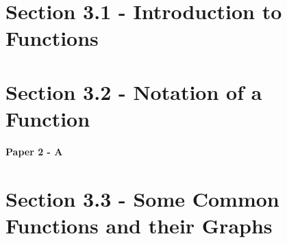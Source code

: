 \documentclass[12pt, a4paper]{article}
\begin{document}
\section*{Section 3.1 - Introduction to Functions }\label{section:4-3-1}





\section*{Section 3.2 - Notation of a Function }\label{section:4-3-2}

\textbf{Paper 2 - A}
\begin{enumx}[label=\arabic*.,start=1]
\item {}\label{DSE2017-CoreP2-Q06} 
\item {}\label{DSE2018-CoreP2-Q07} 
\item {}\label{DSE2019-CoreP2-Q08} 
\item {}\label{DSE2020-CoreP2-Q05} 
\item {}\label{DSE2021-CoreP2-Q07} 
\item {}\label{DSE2022-CoreP2-Q08} 
\item {}\label{DSE2023-CoreP2-Q08} 
\item {}\label{DSE2024-CoreP2-Q08} 
\end{enumx}




\section*{Section 3.3 - Some Common Functions and their Graphs}\label{section:4-3-3}





\end{document}
